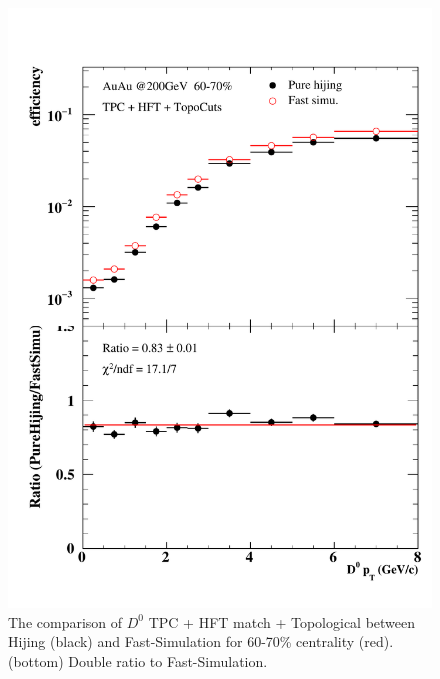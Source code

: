 \begin{figure}[htbp]
\begin{minipage}[htbp]{0.47\linewidth}
\includegraphics[width=1.0\textwidth,angle=0]{figure/Run14_D0HFT/60_70_2.pdf} 
\caption{ The comparison of $D^0$ TPC + HFT match + Topological between Hijing (black) and Fast-Simulation for 60-70\% centrality (red). (bottom) Double ratio to Fast-Simulation.\label{60_70}}
\end{minipage}
\end{figure}

